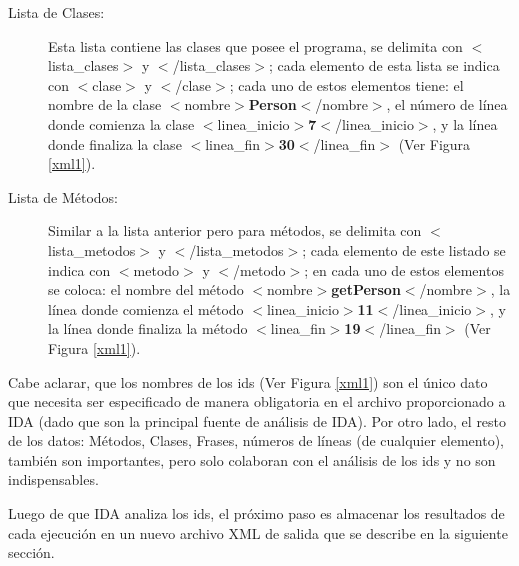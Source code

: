 \begin{appendices}
\begin{description}
\item[Lista de Clases:] Esta lista contiene las clases que posee el programa, se delimita con \mbox{$<$\textsf{lista\_clases}$>$} y \mbox{$<$/\textsf{lista\_clases}$>$}; cada elemento de esta lista se indica con $<$\textsf{clase}$>$ y $<$/\textsf{clase}$>$; cada uno de estos elementos tiene: el nombre de la clase  \mbox{$<$\textsf{nombre}$>$\textbf{Person}$<$/\textsf{nombre}$>$}, el número de línea donde comienza la clase \mbox{$<$\textsf{linea\_inicio}$>$\textbf{7}$<$/\textsf{linea\_inicio}$>$}, y la línea donde finaliza la clase \mbox{$<$\textsf{linea\_fin}$>$\textbf{30}$<$/\textsf{linea\_fin}$>$} (Ver Figura \ref{xml1}). 

\item[Lista de Métodos:] Similar a la lista anterior pero para métodos, se delimita con \mbox{$<$\textsf{lista\_metodos}$>$} y \mbox{$<$/\textsf{lista\_metodos}$>$}; cada elemento de este listado se indica con $<$\textsf{metodo}$>$ y $<$/\textsf{metodo}$>$; en cada uno de estos elementos se coloca: el nombre del método \mbox{$<$\textsf{nombre}$>$\textbf{getPerson}$<$/\textsf{nombre}$>$}, la línea donde comienza el método \mbox{$<$\textsf{linea\_inicio}$>$\textbf{11}$<$/\textsf{linea\_inicio}$>$}, y la línea donde finaliza la método \mbox{$<$\textsf{linea\_fin}$>$\textbf{19}$<$/\textsf{linea\_fin}$>$} (Ver Figura \ref{xml1}).

\end{description}

Cabe aclarar, que los nombres de los ids (Ver Figura \ref{xml1}) son el único dato que necesita ser especificado de manera obligatoria en el archivo proporcionado a IDA (dado que son la principal fuente de análisis de IDA). Por otro lado, el resto de los datos: Métodos, Clases, Frases, números de líneas (de cualquier elemento), también son importantes, pero solo colaboran con el análisis de los ids y no son indispensables.
 
Luego de que IDA analiza los ids, el próximo paso es almacenar los resultados de cada ejecución en un nuevo archivo XML de salida que se describe en la siguiente sección.





\end{appendices}
